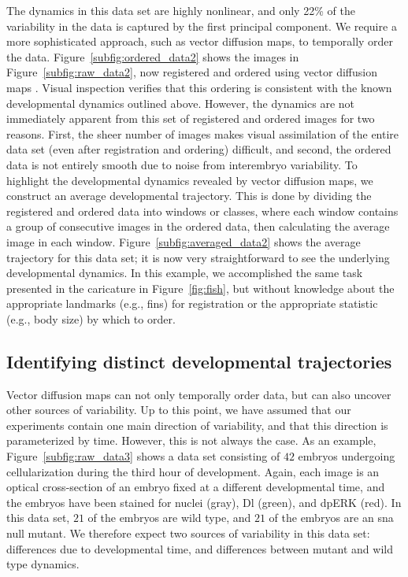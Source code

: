\documentclass{pnastwo}
\begin{document}
\begin{article}
The dynamics in this data set are highly nonlinear, and only 22\% of the variability in the data is captured by the first principal component.
%
We require a more sophisticated approach, such as vector diffusion maps, to temporally order the data.
%
Figure~\ref{subfig:ordered_data2} shows the images in Figure~\ref{subfig:raw_data2}, now registered and ordered using vector diffusion maps \cite{singer2012vector}.
%
Visual inspection verifies that this ordering is consistent with the known developmental dynamics outlined above.
%
However, the dynamics are not immediately apparent from this set of registered and ordered images for two reasons.
%
First, the sheer number of images makes visual assimilation of the entire data set (even after registration and ordering) difficult, and
second, the ordered data is not entirely smooth due to noise from interembryo variability.
%
To highlight the developmental dynamics revealed by vector diffusion maps, we construct an average developmental trajectory.
%
This is done by dividing the registered and ordered data into windows or classes, where each window contains a group of consecutive images in the ordered data, then calculating the average image in each window.
%
Figure~\ref{subfig:averaged_data2} shows the average trajectory for this data set; it is now very straightforward to see the underlying developmental dynamics.
%
In this example, we accomplished the same task presented in the caricature in Figure~\ref{fig:fish}, but without knowledge about the appropriate landmarks (e.g., fins) for registration or the appropriate statistic (e.g., body size) by which to order. 


\subsection{Identifying distinct developmental trajectories}

Vector diffusion maps can not only temporally order data, but can also uncover other sources of variability.
%
Up to this point, we have assumed that our experiments contain one main direction of variability, and that this direction is parameterized by time.
%
However, this is not always the case.
%
As an example, Figure~\ref{subfig:raw_data3} shows a data set consisting of $42$ embryos undergoing cellularization during the third hour of development. 
%
Again, each image is an optical cross-section of an embryo fixed at a different developmental time, and the embryos have been stained for nuclei (gray), Dl (green), and dpERK (red).
%
In this data set, $21$ of the embryos are wild type, and $21$ of the embryos are an sna null mutant.
%
We therefore expect two sources of variability in this data set: differences due to developmental time, and differences between mutant and wild type dynamics.


\end{article}
\end{document}
